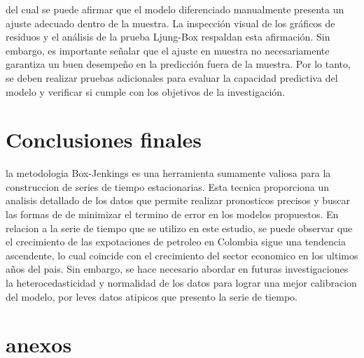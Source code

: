 \documentclass[11pt]{article}
\begin{document}
del cual se puede afirmar que el modelo diferenciado manualmente presenta un ajuste adecuado dentro de la muestra. La inspección visual de los gráficos de residuos y el análisis de la prueba Ljung-Box respaldan esta afirmación. Sin embargo, es importante señalar que el ajuste en muestra no necesariamente garantiza un buen desempeño en la predicción fuera de la muestra. Por lo tanto, se deben realizar pruebas adicionales para evaluar la capacidad predictiva del modelo y verificar si cumple con los objetivos de la investigación.

\section{Conclusiones finales}
 la metodologia Box-Jenkings es una herramienta sumamente valiosa para la construccion de series de tiempo estacionarias.
 Esta tecnica proporciona un analisis detallado de los datos que permite realizar pronosticos precisos y buscar las formas de de minimizar el termino de error en los modelos propuestos. En relacion a la serie de tiempo que se utilizo en este estudio, se puede observar que el crecimiento de las expotaciones de petroleo en Colombia sigue una tendencia ascendente, lo cual coincide con el crecimiento del sector economico en los ultimos años del pais. Sin embargo, se hace necesario abordar en futuras investigaciones la heterocedasticidad y normalidad de los datos para lograr una mejor calibracion del modelo, por leves datos atipicos que presento la serie de tiempo.

\newpage

\nocite{*}


\newpage
\section{anexos}
\end{document}
